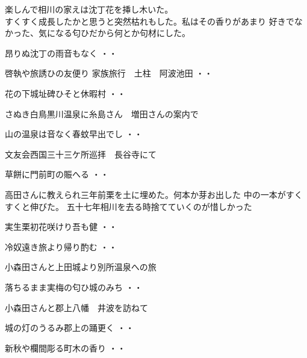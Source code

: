 楽しんで相川の家えは沈丁花を挿し木いた。\\
すくすく成長したかと思うと突然枯れもした。私はその香りがあまり
好きでなかった、気になる匂ひだから何とか句材にした。
\begin{shiika}昂りぬ沈丁の雨音もなく
\hfill{・・}\end{shiika}
\begin{shiika}啓執や旅誘ひの友便り
家族旅行　土柱　阿波池田
\hfill{・・}\end{shiika}
\begin{shiika}花の下城址碑ひそと休暇村
\hfill{・・}\end{shiika}
\vspace{0.6cm}
さぬき白鳥黒川温泉に糸島さん　増田さんの案内で
\begin{shiika}山の温泉は音なく春蚊早出でし
\hfill{・・}\end{shiika}
\vspace{0.6cm}
文友会西国三十三ケ所巡拝　長谷寺にて
\begin{shiika}草餅に門前町の賑へる
\hfill{・・}\end{shiika}
\vspace{0.6cm}
高田さんに教えられ三年前栗を土に埋めた。何本か芽お出した
中の一本がすくすくと伸びた。
五十七年相川を去る時捨てていくのが惜しかった
\begin{shiika}実生栗初花咲けり吾も健
\hfill{・・}\end{shiika}
\begin{shiika}冷奴遠き旅より帰り酌む
\hfill{・・}\end{shiika}
\vspace{0.6cm}
小森田さんと上田城より別所温泉への旅
\begin{shiika}落ちるまま実梅の匂ひ城のみち
\hfill{・・}\end{shiika}
\vspace{0.6cm}
小森田さんと郡上八幡　井波を訪ねて
\begin{shiika}城の灯のうるみ郡上の踊更く
\hfill{・・}\end{shiika}
\vspace{0.6cm}
\begin{shiika}新秋や欄間彫る町木の香り
\hfill{・・}\end{shiika}
